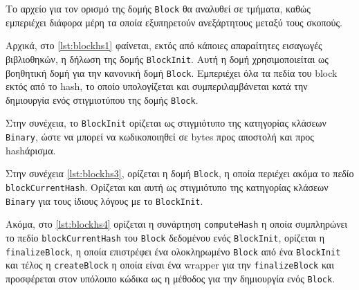 \documentclass{article}
\newcommand{\eng}[1]{\foreignlanguage{english}{#1}} %
\begin{document}
Το αρχείο για τον ορισμό της δομής \texttt{\eng{Block}} θα αναλυθεί σε τμήματα, καθώς
εμπεριέχει διάφορα μέρη τα οποία εξυπηρετούν ανεξάρτητους μεταξύ τους σκοπούς.

Αρχικά, στο \ref{lst:blockhs1} φαίνεται, εκτός από κάποιες απαραίτητες εισαγωγές βιβλιοθηκών,
η δήλωση της δομής \texttt{\eng{BlockInit}}. Αυτή η δομή χρησιμοποιείται ως βοηθητική δομή
για την κανονική δομή \texttt{\eng{Block}}. Εμπεριέχει όλα τα πεδία του \eng{block} εκτός
από το \eng{hash}, το οποίο υπολογίζεται και συμπεριλαμβάνεται κατά την δημιουργία ενός
στιγμιοτύπου της δομής \texttt{\eng{Block}}. 

    

Στην συνέχεια, το \texttt{\eng{BlockInit}} ορίζεται ως στιγμιότυπο της κατηγορίας κλάσεων
\texttt{\eng{Binary}}, ώστε να μπορεί να κωδικοποιηθεί σε \eng{bytes} προς αποστολή και προς
\eng{hash}άρισμα.

    

Στην συνέχεια \ref{lst:blockhs3}, ορίζεται η δομή \texttt{\eng{Block}}, η οποία
περιέχει ακόμα το πεδίο \texttt{\eng{blockCurrentHash}}. Ορίζεται και αυτή ως
στιγμιότυπο της κατηγορίας κλάσεων \texttt{\eng{Binary}} για τους ίδιους λόγους
με το \texttt{\eng{BlockInit}}.

    

Ακόμα, στο \ref{lst:blockhs4} ορίζεται η συνάρτηση \texttt{\eng{computeHash}} η οποία
συμπληρώνει το πεδίο \texttt{\eng{blockCurrentHash}} του \texttt{\eng{Block}} δεδομένου
ενός \texttt{\eng{BlockInit}}, ορίζεται η \texttt{\eng{finalizeBlock}}, η οποία 
επιστρέφει ένα ολοκληρωμένο \texttt{\eng{Block}} από ένα \texttt{\eng{BlockInit}} και
τέλος η \texttt{\eng{createBlock}} η οποία είναι ένα \eng{wrapper} για την
\texttt{\eng{finalizeBlock}} και προσφέρεται στον υπόλοιπο κώδικα ως η μέθοδος
για την δημιουργία ενός \texttt{\eng{Block}}.

    
\end{document}
